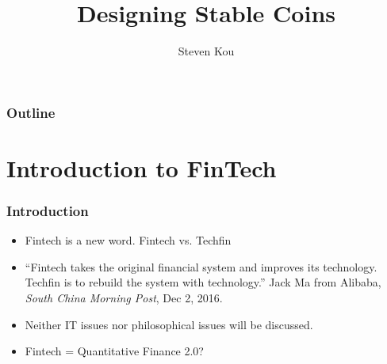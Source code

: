 \documentclass[notes=show, beamer, handout]{beamer}
\title[Designing Stable Coins]{Designing Stable Coins}
\author[S. Kou] %
{Steven Kou\inst{1} }
\institute[NUS] %
{
  \inst{1}
  Risk Management Institute and Department of Mathematics\\
  National University of Singapore \\
  Based on the paper by Yizhou Cao, Min Dai, Steven Kou, Lewei Li, and Chen Yang
}
\date{}
\begin{document}
\begin{frame}
  \titlepage
%
%
%
\end{frame}

\begin{frame}
  \frametitle{Outline}
  \tableofcontents
\end{frame}

\section{Introduction to FinTech}

\begin{frame}
    \frametitle{Introduction}
    \begin{itemize}
        \item Fintech is a new word.  Fintech vs. Techfin
        \pause
        \item ``Fintech takes the original financial system and improves its technology. Techfin is to rebuild the system with technology.'' Jack Ma from Alibaba, {\it South China Morning Post}, Dec 2, 2016.
        \pause
        \item Neither IT issues nor philosophical issues will be discussed.
        \pause
        \item Fintech = Quantitative Finance 2.0?
   \end{itemize}
\end{frame}
\end{document}
